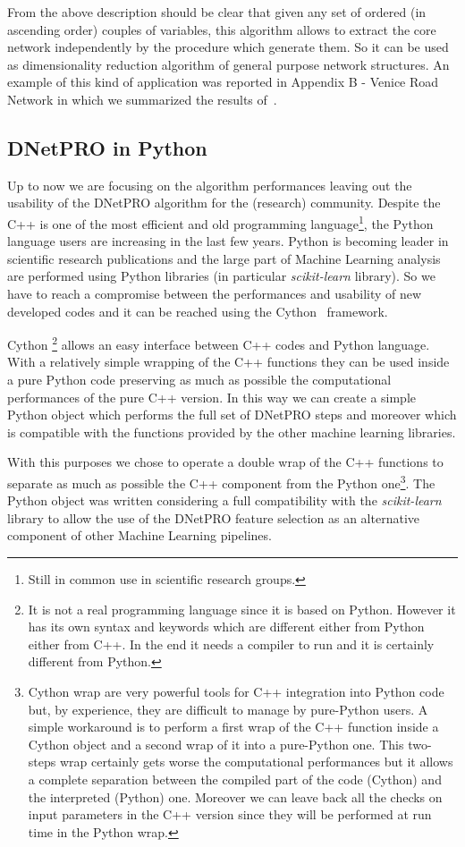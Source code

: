 \documentclass{standalone}
\begin{document}
From the above description should be clear that given any set of ordered (in ascending order) couples of variables, this algorithm allows to extract the core network independently by the procedure which generate them.
So it can be used as dimensionality reduction algorithm of general purpose network structures.
An example of this kind of application was reported in Appendix B - Venice Road Network in which we summarized the results of~\cite{Mizzi2018, CurtiSDPS2018}.


\subsection[Python wrap]{DNetPRO in Python}\label{implementation:python}

Up to now we are focusing on the algorithm performances leaving out the usability of the DNetPRO algorithm for the (research) community.
Despite the C++ is one of the most efficient and old programming language\footnote{
  Still in common use in scientific research groups.
}, the Python language users are increasing in the last few years.
Python is becoming leader in scientific research publications and the large part of Machine Learning analysis are performed using Python libraries (in particular \emph{scikit-learn} library).
So we have to reach a compromise between the performances and usability of new developed codes and it can be reached using the Cython~\cite{behnel2010cython} framework.

Cython \footnote{
  It is not a real programming language since it is based on Python.
  However it has its own syntax and keywords which are different either from Python either from C++.
  In the end it needs a compiler to run and it is certainly different from Python.
} allows an easy interface between C++ codes and Python language.
With a relatively simple wrapping of the C++ functions they can be used inside a pure Python code preserving as much as possible the computational performances of the pure C++ version.
In this way we can create a simple Python object which performs the full set of DNetPRO steps and moreover which is compatible with the functions provided by the other machine learning libraries.

With this purposes we chose to operate a double wrap of the C++ functions to separate as much as possible the C++ component from the Python one\footnote{
  Cython wrap are very powerful tools for C++ integration into Python code but, by experience, they are difficult to manage by pure-Python users.
  A simple workaround is to perform a first wrap of the C++ function inside a Cython object and a second wrap of it into a pure-Python one.
  This two-steps wrap certainly gets worse the computational performances but it allows a complete separation between the compiled part of the code (Cython) and the interpreted (Python) one.
  Moreover we can leave back all the checks on input parameters
  in the C++ version since they will be performed at run time in the Python wrap.
}.
The Python object was written considering a full compatibility with the \emph{scikit-learn} library to allow the use of the DNetPRO feature selection as an alternative component of other Machine Learning pipelines.
\end{document}
